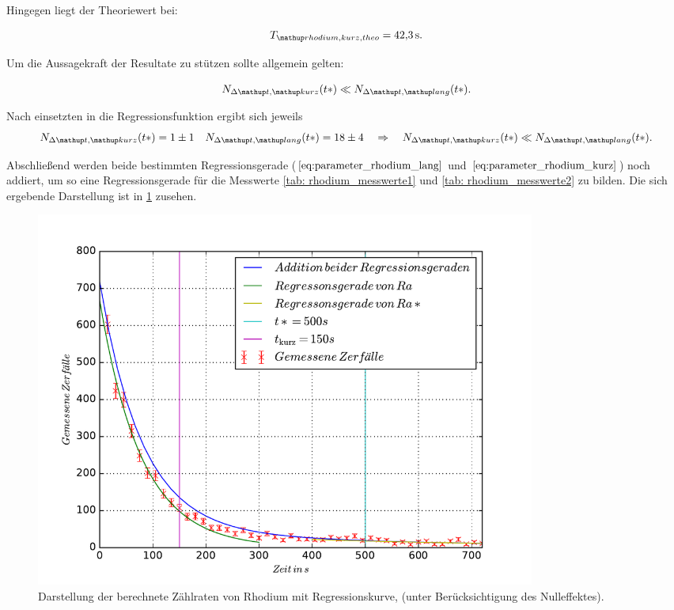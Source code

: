 Hingegen liegt der Theoriewert\cite{rhodium_kurz_halb} bei:

\begin{equation}
  \label{eq:halbwertzeit_rhodium_kurz_theo}
  T\ua{rhodium, kurz, theo}=\SI{42.3}{\second}.
\end{equation}



Um die Aussagekraft der Resultate zu stützen sollte allgemein gelten:

\begin{equation*}
  N_{\Delta \map{t}, \map{kurz}}(t*)\ll N_{\Delta \map{t}, \map{lang}}(t*).
\end{equation*}

Nach einsetzten in die Regressionsfunktion ergibt sich jeweils %
\begin{equation*}
    N_{\Delta \map{t}, \map{kurz}}(t*)= 1\pm1 \quad  N_{\Delta \map{t}, \map{lang}}(t*)= 18\pm 4 \quad \Rightarrow \quad N_{\Delta \map{t}, \map{kurz}}(t*)\ll N_{\Delta \map{t}, \map{lang}}(t*).
\end{equation*}

Abschließend werden beide bestimmten Regressionsgerade ($\eqref{eq:parameter_rhodium_lang}$ und $\eqref{eq:parameter_rhodium_kurz}$) noch addiert, um so eine %
Regressionsgerade für die Messwerte \ref{tab: rhodium_messwerte1} und \ref{tab: rhodium_messwerte2} zu bilden.
Die sich ergebende Darstellung ist in \ref{fig: plot_rhodium_addi} zusehen. %

\begin{figure}
  \centering
  \includegraphics[width=0.8\textwidth]{pics/ra_addi.pdf}
  \caption{Darstellung der berechnete Zählraten von Rhodium mit Regressionskurve, (unter Berücksichtigung des Nulleffektes).} %
  \label{fig: plot_rhodium_addi}
\end{figure}
